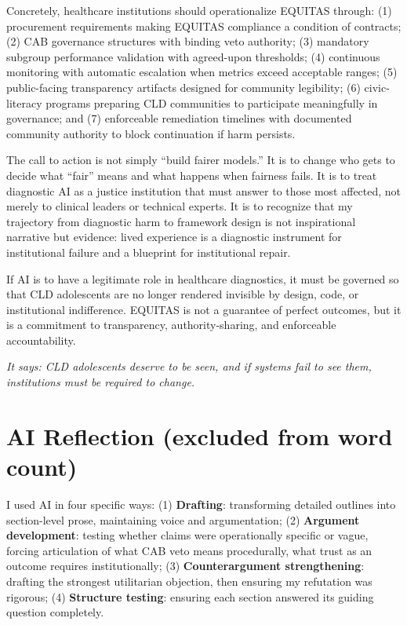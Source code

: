 \documentclass[12pt,a4paper]{article}
\begin{document}
Concretely, healthcare institutions should operationalize EQUITAS through: (1) procurement requirements making EQUITAS compliance a condition of contracts; (2) CAB governance structures with binding veto authority; (3) mandatory subgroup performance validation with agreed-upon thresholds; (4) continuous monitoring with automatic escalation when metrics exceed acceptable ranges; (5) public-facing transparency artifacts designed for community legibility; (6) civic-literacy programs preparing CLD communities to participate meaningfully in governance; and (7) enforceable remediation timelines with documented community authority to block continuation if harm persists.\cite{garcia_ed415}

The call to action is not simply ``build fairer models.'' It is to change who gets to decide what ``fair'' means and what happens when fairness fails. It is to treat diagnostic AI as a justice institution that must answer to those most affected, not merely to clinical leaders or technical experts. It is to recognize that my trajectory from diagnostic harm to framework design is not inspirational narrative but evidence: lived experience is a diagnostic instrument for institutional failure and a blueprint for institutional repair.\cite{garcia_ed415}

If AI is to have a legitimate role in healthcare diagnostics, it must be governed so that CLD adolescents are no longer rendered invisible by design, code, or institutional indifference. EQUITAS is not a guarantee of perfect outcomes, but it is a commitment to transparency, authority-sharing, and enforceable accountability. 

\textit{It says: CLD adolescents deserve to be seen, and if systems fail to see them, institutions must be required to change.}\cite{garcia_ed415}

\section*{AI Reflection (excluded from word count)}

I used AI in four specific ways: (1) \textbf{Drafting}: transforming detailed outlines into section-level prose, maintaining voice and argumentation; (2) \textbf{Argument development}: testing whether claims were operationally specific or vague, forcing articulation of what CAB veto means procedurally, what trust as an outcome requires institutionally; (3) \textbf{Counterargument strengthening}: drafting the strongest utilitarian objection, then ensuring my refutation was rigorous; (4) \textbf{Structure testing}: ensuring each section answered its guiding question completely.
\end{document}
